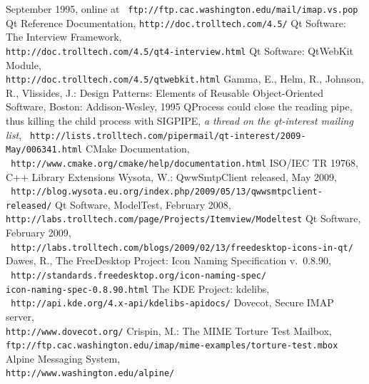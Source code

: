 \documentclass[12pt,notitlepage]{report}
\begin{document}
\begin{thebibliography}{99}
        September 1995, online at {\tt
        ftp://ftp.cac.washington.edu/mail/imap.vs.pop}
     Qt Reference Documentation, {\tt http://doc.trolltech.com/4.5/}
    Qt Software: The Interview Framework, \\
        {\tt http://doc.trolltech.com/4.5/qt4-interview.html}
    Qt Software: QtWebKit Module, \\
        {\tt http://doc.trolltech.com/4.5/qtwebkit.html}
    Gamma, E., Helm, R., Johnson, R., Vlissides, J.: Design
        Patterns: Elements of Reusable Object-Oriented Software, Boston:
        Addison-Wesley, 1995
    QProcess could close the reading pipe, thus
        killing the child process with SIGPIPE, {\em a thread on the qt-interest
        mailing list}, {\tt
        http://lists.trolltech.com/pipermail/qt-interest/2009-May/006341.html}
     CMake Documentation, \\{\tt
        http://www.cmake.org/cmake/help/documentation.html}
     ISO/IEC TR 19768, C++ Library Extensions
     Wysota, W.: QwwSmtpClient released, May 2009, \\
        {\tt
        http://blog.wysota.eu.org/index.php/2009/05/13/qwwsmtpclient-released/}
     Qt Software, ModelTest, February 2008, \\
        {\tt http://labs.trolltech.com/page/Projects/Itemview/Modeltest}
     Qt Software, February 2009, \\ {\tt
        http://labs.trolltech.com/blogs/2009/02/13/freedesktop-icons-in-qt/}
    Dawes, R., The FreeDesktop Project: Icon Naming
        Specification v.~0.8.90, \\{\tt
        http://standards.freedesktop.org/icon-naming-spec/\\icon-naming-spec-0.8.90.html}
     The KDE Project: kdelibs, \\{\tt
        http://api.kde.org/4.x-api/kdelibs-apidocs/}
    Dovecot, Secure IMAP server, \\
        {\tt http://www.dovecot.org/}
    Crispin, M.: The MIME Torture Test Mailbox, \\
        {\tt ftp://ftp.cac.washington.edu/imap/mime-examples/torture-test.mbox}
    Alpine Messaging System, \\{\tt http://www.washington.edu/alpine/}

\end{thebibliography}
\end{document}

